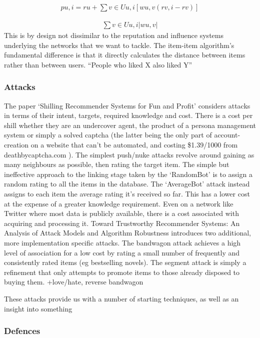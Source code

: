 \begin{align*}
pu,i = ru +       ∑v∈Uu,i [wu,v (rv,i − rv )]
\end{align*}

\begin{align*}
∑v∈Uu,i |wu,v |
\end{align*}
This is by design not dissimilar to the reputation and influence systems underlying the networks that we want to tackle. The item-item algorithm’s fundamental difference is that it directly calculates the distance between items rather than between users. “People who liked X also liked Y”

\subsubsection{Attacks}

The paper `Shilling Recommender Systems for Fun and Profit' considers attacks in terms of their intent, targets, required knowledge and cost. There is a cost per shill whether they are an undercover agent, the product of a persona management system or simply a solved captcha (the latter being the only part of account-creation on a website that can't be automated, and costing \$1.39/1000 from deathbycaptcha.com ). The simplest push/nuke attacks revolve around gaining as many neighbours as possible, then rating the target item. The simple but ineffective approach to the linking stage taken by the `RandomBot' is to assign a random rating to all the items in the database. The `AverageBot' attack instead assigns to each item the average rating it's received so far. This has a lower cost at the expense of a greater knowledge requirement. Even on a network like Twitter where most data is publicly available, there is a cost associated with acquiring and processing it. Toward Trustworthy Recommender Systems: An Analysis of Attack Models and Algorithm Robustness introduces two additional, more implementation specific attacks. The bandwagon attack achieves a high level of association for a low cost by rating a small number of frequently and consistently rated items (eg bestselling novels).  The segment attack is simply a refinement that only attempts to promote items to those already disposed to buying them. +love/hate, reverse bandwagon

These attacks provide us with a number of starting techniques, as well as an insight into something

\subsubsection{Defences}

